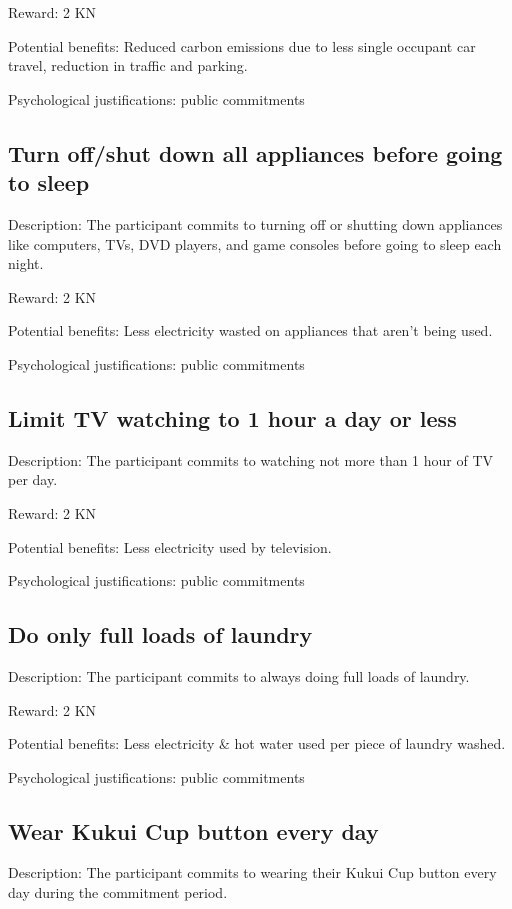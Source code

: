 Reward: 2 KN

Potential benefits: Reduced carbon emissions due to less single occupant car travel, reduction in traffic and parking.

Psychological justifications: public commitments

\subsection{Turn off/shut down all appliances before going to sleep}

Description: The participant commits to turning off or shutting down appliances like computers, TVs, DVD players, and game consoles before going to sleep each night.

Reward: 2 KN

Potential benefits: Less electricity wasted on appliances that aren't being used.

Psychological justifications: public commitments

\subsection{Limit TV watching to 1 hour a day or less}

Description: The participant commits to watching not more than 1 hour of TV per day.

Reward: 2 KN

Potential benefits: Less electricity used by television.

Psychological justifications: public commitments

\subsection{Do only full loads of laundry}

Description: The participant commits to always doing full loads of laundry.

Reward: 2 KN

Potential benefits: Less electricity \& hot water used per piece of laundry washed.

Psychological justifications: public commitments

\subsection{Wear Kukui Cup button every day}

Description: The participant commits to wearing their Kukui Cup button every day during the commitment period.

